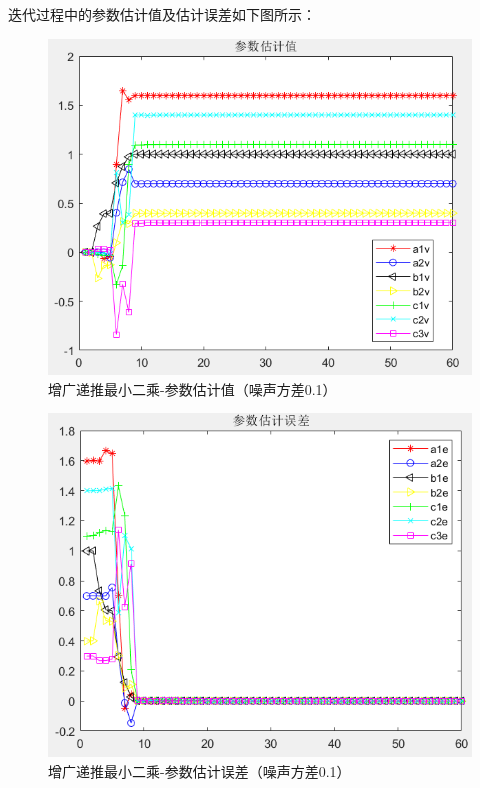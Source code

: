 \documentclass[UTF8]{article}
\begin{document}
迭代过程中的参数估计值及估计误差如下图所示：
\begin{figure}[H]
    \centering %
    \includegraphics[width=.8\textwidth]{figure/增广递推最小二乘-参数估计值.png} 
    \caption{增广递推最小二乘-参数估计值（噪声方差0.1）} %
\end{figure}
\begin{figure}[H]
    \centering %
    \includegraphics[width=.8\textwidth]{figure/增广递推最小二乘-参数估计误差.png} 
    \caption{增广递推最小二乘-参数估计误差（噪声方差0.1）} %
\end{figure}
\end{document}

